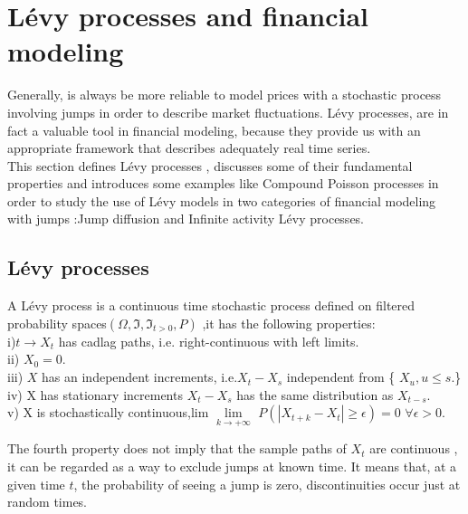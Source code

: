 \documentclass[12pt]{report}
\begin{document}
\chapter{Lévy processes and financial modeling}

Generally, is always be more reliable to model prices with a stochastic process involving jumps in order to describe  market fluctuations.
Lévy processes, are in fact a valuable tool in financial modeling, because they  provide us with an appropriate
framework that describes adequately real time series.\\


This section defines Lévy processes , discusses some of their fundamental properties and introduces some examples like Compound Poisson processes in order to study the use of Lévy models in two categories of financial modeling with jumps :Jump diffusion and Infinite activity Lévy processes.

\section{ Lévy processes }

A Lévy process is a continuous time stochastic process defined on filtered probability spaces$(\Omega,\mathfrak{I},\mathfrak{I}_{t>0},P)$ ,it has the following properties:\\

i)$t \rightarrow X _t$ has cadlag paths, i.e. right-continuous with left limits.\\
ii) $X_0=0$.\\
iii) $X$ has an independent increments, i.e.$ X_t- X_s$ independent from \{ $X_u,{ u \leqslant s}.$\}\\
iv) X has stationary increments $X_t-X_s$ has the same distribution as $ X_{t-s}.$\\
v) X is stochastically continuous,lim $\lim\limits_{k \rightarrow +\infty}$ $P(|X_{t+k}-X_t|  \geqslant \epsilon)=   0 $   $   \forall       \epsilon > 0.$

The fourth property does not imply that the sample paths of $ X_t$ are continuous , it can be regarded as a way to exclude jumps at known time. It means that, at a given time $t$, the probability of seeing a jump is zero, discontinuities occur just at random times.\\
\end{document}
